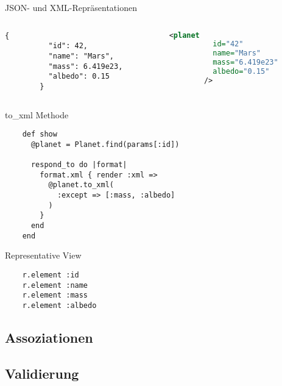 \begin{frame}[fragile]{JSON- und XML-Repräsentationen}

  \begin{columns}[t]
    \begin{column}{.45\textwidth}
      \begin{lstlisting}[language={},gobble=8]
        {
          "id": 42,
          "name": "Mars",
          "mass": 6.419e23,
          "albedo": 0.15
        }
      \end{lstlisting}
    \end{column}
    \begin{column}{.45\textwidth}
      \begin{lstlisting}[language=XML,gobble=8]
        <planet
          id="42"
          name="Mars"
          mass="6.419e23"
          albedo="0.15"
        />
      \end{lstlisting}
    \end{column}
  \end{columns}
\end{frame}

\begin{frame}[fragile]{to\_xml Methode}
  \begin{lstlisting}
    def show
      @planet = Planet.find(params[:id])

      respond_to do |format|
        format.xml { render :xml =>
          @planet.to_xml(
            :except => [:mass, :albedo]
          )
        }
      end
    end
  \end{lstlisting}
\end{frame}

\begin{frame}[fragile]{Representative View}
  \begin{lstlisting}
    r.element :id
    r.element :name
    r.element :mass
    r.element :albedo
  \end{lstlisting}
\end{frame}

\subsection{Assoziationen}


\subsection{Validierung}




